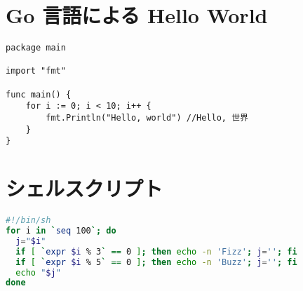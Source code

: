 \documentclass{jlreq}
\begin{document}
\section{Go 言語による Hello World}

\begin{lstlisting}[language=Golang]
package main

import "fmt"

func main() {
	for i := 0; i < 10; i++ {
		fmt.Println("Hello, world") //Hello, 世界
	}
}
\end{lstlisting}

\section{シェルスクリプト}

\begin{lstlisting}[language=sh]
#!/bin/sh
for i in `seq 100`; do
  j="$i"
  if [ `expr $i % 3` == 0 ]; then echo -n 'Fizz'; j=''; fi
  if [ `expr $i % 5` == 0 ]; then echo -n 'Buzz'; j=''; fi
  echo "$j"
done
\end{lstlisting}
\end{document}
